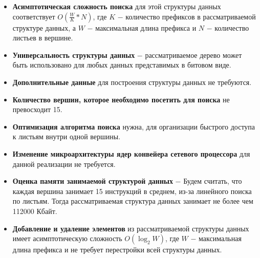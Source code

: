 \documentclass[a4paper, 12pt, titlepage, finall]{extreport}
\begin{document}
            \begin{itemize}
                \item\textbf{Асимптотическая сложность поиска} для этой структуры данных соответствует {\ttfamily $O(\frac{W}{K}*N)$},
                где {\ttfamily $K$} $-$ количество префиксов в рассматриваемой структуре данных, а {\ttfamily $W$} $-$ максимальная длина префикса
                и {\ttfamily $N$} $-$ количество листьев в вершине.
                \item\textbf{Универсальность структуры данных} $-$ рассматриваемое дерево может быть использовано для любых данных представимых в битовом виде.
                \item\textbf{Дополнительные данные} для построения структуры данных не требуются.
                \item\textbf{Количество вершин, которое необходимо посетить для поиска} не превосходит 15. 
                \item\textbf{Оптимизация алгоритма поиска} нужна, для организации быстрого доступа к листьям внутри одной вершины. 
                \item\textbf{Изменение микроархитектуры ядер конвейера сетевого процессора} для данной реализации не требуется.
                \item\textbf{Оценка памяти занимаемой структурой данных} $-$ Будем считать, что каждая вершина занимает 15 инструкций в среднем, из-за линейного поиска по листьям. 
                Тогда рассматриваемая структура данных занимает не более чем 112000 Кбайт.
                \item\textbf{Добавление и удаление элементов} из рассматриваемой структуры данных имеет асимптотическую сложность 
                {\ttfamily $O(\log_2{W})$}, где {\ttfamily $W$} $-$ максимальная длина префикса и не требует перестройки всей структуры данных.\\
            \end{itemize}
\end{document}
